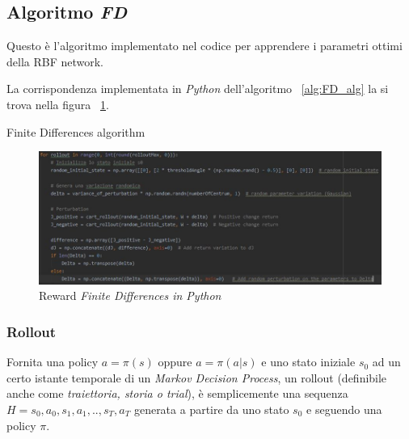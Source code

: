 \subsection{Algoritmo \textit{FD}}
Questo è l'algoritmo implementato nel codice per apprendere i parametri ottimi della RBF network.

La corrispondenza implementata in \textit{Python} dell'algoritmo ~\ref{alg:FD_alg} la si trova nella figura ~\ref{fig:FD_py_alg}.

\begin{algorithm} [h!]
	\SetAlgoLined
	\caption{Finite Differences algorithm}
	\label{alg:FD_alg}
\end{algorithm}

\begin{figure}[!h]
	\centering
	\includegraphics[width=\textwidth]{Immagini/FD_alg_python.JPG}
	\caption{Reward \textit{Finite Differences in Python}}
	\label{fig:FD_py_alg}
\end{figure}

\subsubsection{Rollout}
\label{sec:rollout}
Fornita una policy $a = \pi(s)$ oppure $a = \pi(a|s)$ e uno stato iniziale $s_0$ ad un certo istante temporale di un \textit{Markov Decision Process}, un rollout (definibile anche come \textit{traiettoria, storia o trial}), è semplicemente una sequenza \textbf{$H = s_0, a_0, s_1, a_1, .. , s_T, a_T$} generata a partire da uno stato $s_0$ e seguendo una policy $\pi$.

